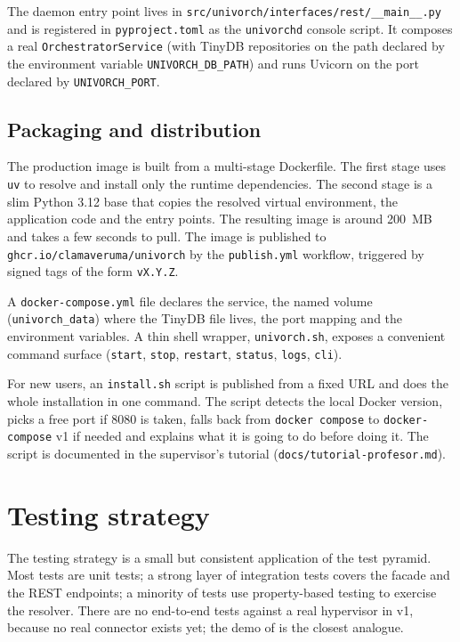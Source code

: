The daemon entry point lives in
\texttt{src/univorch/interfaces/rest/\_\_main\_\_.py} and is
registered in \texttt{pyproject.toml} as the \texttt{univorchd}
console script. It composes a real \texttt{OrchestratorService} (with
TinyDB repositories on the path declared by the environment
variable \texttt{UNIVORCH\_DB\_PATH}) and runs Uvicorn on the port
declared by \texttt{UNIVORCH\_PORT}.

\subsection{Packaging and distribution}

The production image is built from a multi-stage Dockerfile. The
first stage uses \texttt{uv} to resolve and install only the
runtime dependencies. The second stage is a slim Python 3.12 base
that copies the resolved virtual environment, the application code
and the entry points. The resulting image is around 200~MB and
takes a few seconds to pull. The image is published to
\texttt{ghcr.io/clamaveruma/univorch} by the \texttt{publish.yml}
workflow, triggered by signed tags of the form \texttt{vX.Y.Z}.

A \texttt{docker-compose.yml} file declares the service, the
named volume (\texttt{univorch\_data}) where the TinyDB file
lives, the port mapping and the environment variables. A thin
shell wrapper, \texttt{univorch.sh}, exposes a convenient command
surface (\texttt{start}, \texttt{stop}, \texttt{restart},
\texttt{status}, \texttt{logs}, \texttt{cli}).

For new users, an \texttt{install.sh} script is published from a
fixed URL and does the whole installation in one command. The
script detects the local Docker version, picks a free port if 8080
is taken, falls back from \texttt{docker compose} to
\texttt{docker-compose} v1 if needed and explains what it is going
to do before doing it. The script is documented in the supervisor's
tutorial (\texttt{docs/tutorial-profesor.md}).

\section{Testing strategy}
\label{sec:pruebas}

The testing strategy is a small but consistent application of the
test pyramid. Most tests are unit tests; a strong layer of
integration tests covers the facade and the REST endpoints; a
minority of tests use property-based testing to exercise the
resolver. There are no end-to-end tests against a real hypervisor
in v1, because no real connector exists yet; the demo of
 is the closest analogue.

